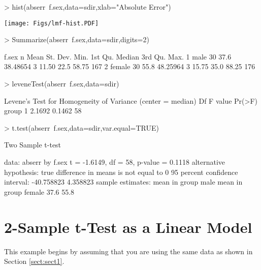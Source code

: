 \documentclass[a4paper]{article}
\begin{document}
\begin{Schunk}
\begin{Sinput}
> hist(abserr~f.sex,data=sdir,xlab="Absolute Error")
\end{Sinput}
\end{Schunk}
\texttt{[image: Figs/lmf-hist.PDF]}
\begin{Schunk}
\begin{Sinput}
> Summarize(abserr~f.sex,data=sdir,digits=2)
\end{Sinput}
\begin{Soutput}
   f.sex  n Mean St. Dev. Min. 1st Qu. Median 3rd Qu. Max.
1   male 30 37.6 38.48654    3   11.50   22.5   58.75  167
2 female 30 55.8 48.25964    3   15.75   35.0   88.25  176
\end{Soutput}
\begin{Sinput}
> leveneTest(abserr~f.sex,data=sdir)
\end{Sinput}
\begin{Soutput}
Levene's Test for Homogeneity of Variance (center = median)
      Df F value Pr(>F)
group  1  2.1692 0.1462
      58               
\end{Soutput}
\begin{Sinput}
> t.test(abserr~f.sex,data=sdir,var.equal=TRUE)
\end{Sinput}
\begin{Soutput}
	Two Sample t-test

data:  abserr by f.sex 
t = -1.6149, df = 58, p-value = 0.1118
alternative hypothesis: true difference in means is not equal to 0 
95 percent confidence interval:
 -40.758823   4.358823 
sample estimates:
  mean in group male mean in group female 
                37.6                 55.8 
\end{Soutput}
\end{Schunk}

\section{2-Sample t-Test as a Linear Model}
This example begins by assuming that you are using the same data as shown in Section \ref{sect:sect1}.
\vspace{-12pt}
\end{document}
